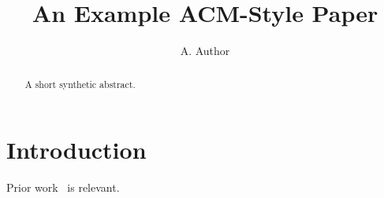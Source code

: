 \documentclass[sigconf]{acmart}
\title{An Example ACM-Style Paper}
\author{A. Author}
\affiliation{\institution{Example University}\country{Nowhere}}
\begin{document}
\begin{abstract}
A short synthetic abstract.
\end{abstract}
\maketitle
\section{Introduction}
Prior work~\cite{gamma2021} is relevant.
\printbibliography
\end{document}

